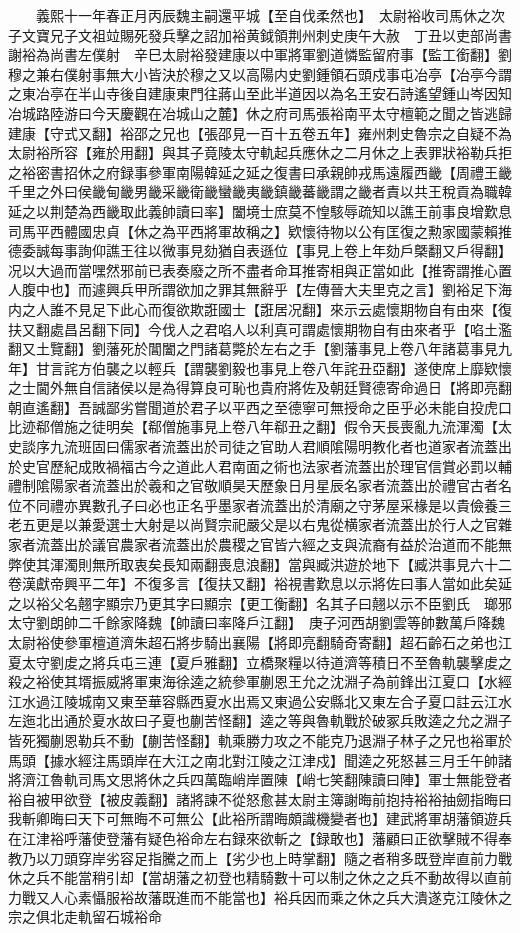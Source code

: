 　　義熙十一年春正月丙辰魏主嗣還平城【至自伐柔然也】　太尉裕收司馬休之次子文寶兄子文祖竝賜死發兵擊之詔加裕黄鉞領荆州刺史庚午大赦　丁丑以吏部尚書謝裕為尚書左僕射　辛巳太尉裕發建康以中軍將軍劉道憐監留府事【監工銜翻】劉穆之兼右僕射事無大小皆決於穆之又以高陽内史劉鍾領石頭戍事屯冶亭【冶亭今謂之東冶亭在半山寺後自建康東門往蔣山至此半道因以為名王安石詩遙望鍾山岑因知冶城路陸游曰今天慶觀在冶城山之麓】休之府司馬張裕南平太守檀範之聞之皆逃歸建康【守式又翻】裕邵之兄也【張邵見一百十五卷五年】雍州刺史魯宗之自疑不為太尉裕所容【雍於用翻】與其子竟陵太守軌起兵應休之二月休之上表罪狀裕勒兵拒之裕密書招休之府録事參軍南陽韓延之延之復書曰承親帥戎馬遠履西畿【周禮王畿千里之外曰侯畿甸畿男畿采畿衛畿蠻畿夷畿鎮畿蕃畿謂之畿者責以共王稅貢為職韓延之以荆楚為西畿取此義帥讀曰率】闔境士庶莫不惶駭辱疏知以譙王前事良增歎息司馬平西體國忠貞【休之為平西將軍故稱之】欵懷待物以公有匡復之勲家國蒙賴推德委誠每事詢仰譙王往以微事見劾猶自表遜位【事見上卷上年劾戶槩翻又戶得翻】况以大過而當嘿然邪前已表奏廢之所不盡者命耳推寄相與正當如此【推寄謂推心置人腹中也】而遽興兵甲所謂欲加之罪其無辭乎【左傳晉大夫里克之言】劉裕足下海内之人誰不見足下此心而復欲欺誑國士【誑居况翻】來示云處懷期物自有由來【復扶又翻處昌呂翻下同】今伐人之君啗人以利真可謂處懷期物自有由來者乎【啗土濫翻又土覽翻】劉藩死於閶闔之門諸葛斃於左右之手【劉藩事見上卷八年諸葛事見九年】甘言詫方伯襲之以輕兵【謂襲劉毅也事見上卷八年詫丑亞翻】遂使席上靡欵懷之士閫外無自信諸侯以是為得算良可恥也貴府將佐及朝廷賢德寄命過日【將即亮翻朝直遙翻】吾誠鄙劣嘗聞道於君子以平西之至德寧可無授命之臣乎必未能自投虎口比迹郗僧施之徒明矣【郗僧施事見上卷八年郗丑之翻】假令天長喪亂九流渾濁【太史談序九流班固曰儒家者流蓋出於司徒之官助人君順隂陽明教化者也道家者流蓋出於史官歷紀成敗禍福古今之道此人君南面之術也法家者流蓋出於理官信賞必罰以輔禮制隂陽家者流蓋出於羲和之官敬順昊天歷象日月星辰名家者流蓋出於禮官古者名位不同禮亦異數孔子曰必也正名乎墨家者流蓋出於清廟之守茅屋采椽是以貴儉養三老五更是以兼愛選士大射是以尚賢宗祀嚴父是以右鬼從横家者流蓋出於行人之官雜家者流蓋出於議官農家者流蓋出於農稷之官皆六經之支與流裔有益於治道而不能無弊使其渾濁則無所取衷矣長知兩翻喪息浪翻】當與臧洪遊於地下【臧洪事見六十二卷漢獻帝興平二年】不復多言【復扶又翻】裕視書歎息以示將佐曰事人當如此矣延之以裕父名翹字顯宗乃更其字曰顯宗【更工衡翻】名其子曰翹以示不臣劉氏　瑯邪太守劉朗帥二千餘家降魏【帥讀曰率降戶江翻】　庚子河西胡劉雲等帥數萬戶降魏　太尉裕使參軍檀道濟朱超石將步騎出襄陽【將即亮翻騎奇寄翻】超石齡石之弟也江夏太守劉䖍之將兵屯三連【夏戶雅翻】立橋聚糧以待道濟等積日不至魯軌襲擊䖍之殺之裕使其壻振威將軍東海徐逵之統參軍蒯恩王允之沈淵子為前鋒出江夏口【水經江水過江陵城南又東至華容縣西夏水出焉又東過公安縣北又東左合子夏口註云江水左迤北出通於夏水故曰子夏也蒯苦怪翻】逵之等與魯軌戰於破冢兵敗逵之允之淵子皆死獨蒯恩勒兵不動【蒯苦怪翻】軌乘勝力攻之不能克乃退淵子林子之兄也裕軍於馬頭【據水經注馬頭岸在大江之南北對江陵之江津戍】聞逵之死怒甚三月壬午帥諸將濟江魯軌司馬文思將休之兵四萬臨峭岸置陳【峭七笑翻陳讀曰陣】軍士無能登者裕自被甲欲登【被皮義翻】諸將諫不從怒愈甚太尉主簿謝晦前抱持裕裕抽劒指晦曰我斬卿晦曰天下可無晦不可無公【此裕所謂晦頗識機變者也】建武將軍胡藩領遊兵在江津裕呼藩使登藩有疑色裕命左右録來欲斬之【録敢也】藩顧曰正欲擊賊不得奉教乃以刀頭穿岸劣容足指騰之而上【劣少也上時掌翻】隨之者稍多既登岸直前力戰休之兵不能當稍引却【當胡藩之初登也精騎數十可以制之休之之兵不動故得以直前力戰又人心素懾服裕故藩既進而不能當也】裕兵因而乘之休之兵大潰遂克江陵休之宗之俱北走軌留石城裕命